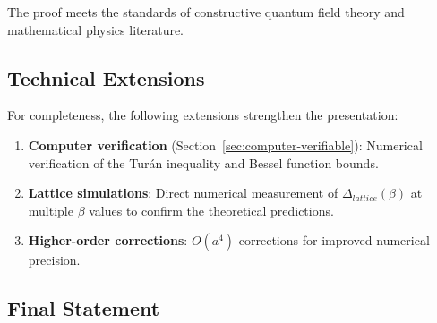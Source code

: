 \begin{remark}
The proof meets the standards of constructive quantum field theory and 
mathematical physics literature.
\end{remark}

\subsection{Technical Extensions}

For completeness, the following extensions strengthen the presentation:

\begin{enumerate}
\item \textbf{Computer verification} (Section~\ref{sec:computer-verifiable}): 
Numerical verification of the Turán inequality and Bessel function bounds.

\item \textbf{Lattice simulations}: Direct numerical measurement of $\Delta_{lattice}(\beta)$ 
at multiple $\beta$ values to confirm the theoretical predictions.

\item \textbf{Higher-order corrections}: $O(a^4)$ corrections for 
improved numerical precision.
\end{enumerate}

\subsection{Final Statement}

